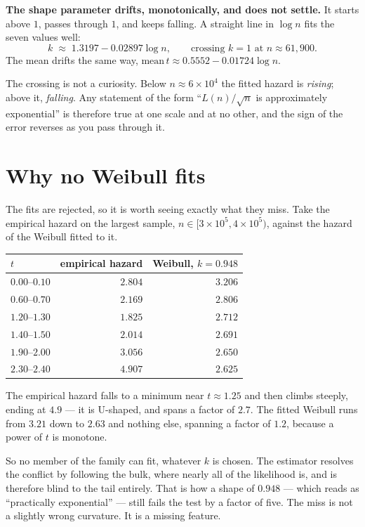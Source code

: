 \documentclass[12pt,a4paper]{article}
\begin{document}
\textbf{The shape parameter drifts, monotonically, and does not settle.} It starts above $1$, passes through $1$, and keeps falling. A straight line in $\log n$ fits the seven values well:
\[
  k \;\approx\; 1.3197 - 0.02897 \log n,
  \qquad\text{crossing } k=1 \text{ at } n \approx 61{,}900 .
\]
The mean drifts the same way, $\text{mean}\,t \approx 0.5552 - 0.01724\log n$.

\begin{tcolorbox}[colback=blue!6, colframe=blue!45!black, arc=2mm]
The crossing is not a curiosity. Below $n\approx 6\times 10^4$ the fitted hazard is \emph{rising}; above it, \emph{falling}. Any statement of the form ``$L(n)/\sqrt n$ is approximately exponential'' is therefore true at one scale and at no other, and the sign of the error reverses as you pass through it.
\end{tcolorbox}

\section{Why no Weibull fits}

The fits are rejected, so it is worth seeing exactly what they miss. Take the empirical hazard on the largest sample, $n\in[3\times10^5,4\times10^5)$, against the hazard of the Weibull fitted to it.

\begin{center}
\begin{tabular}{lrr}
\toprule
$t$ & empirical hazard & Weibull, $k=0.948$ \\
\midrule
$0.00$--$0.10$ & $2.804$ & $3.206$ \\
$0.60$--$0.70$ & $2.169$ & $2.806$ \\
$1.20$--$1.30$ & $1.825$ & $2.712$ \\
$1.40$--$1.50$ & $2.014$ & $2.691$ \\
$1.90$--$2.00$ & $3.056$ & $2.650$ \\
$2.30$--$2.40$ & $4.907$ & $2.625$ \\
\bottomrule
\end{tabular}
\end{center}

The empirical hazard falls to a minimum near $t\approx 1.25$ and then climbs steeply, ending at $4.9$ --- it is U-shaped, and spans a factor of $2.7$. The fitted Weibull runs from $3.21$ down to $2.63$ and nothing else, spanning a factor of $1.2$, because a power of $t$ is monotone.

So no member of the family can fit, whatever $k$ is chosen. The estimator resolves the conflict by following the bulk, where nearly all of the likelihood is, and is therefore blind to the tail entirely. That is how a shape of $0.948$ --- which reads as ``practically exponential'' --- still fails the test by a factor of five. The miss is not a slightly wrong curvature. It is a missing feature.
\end{document}
